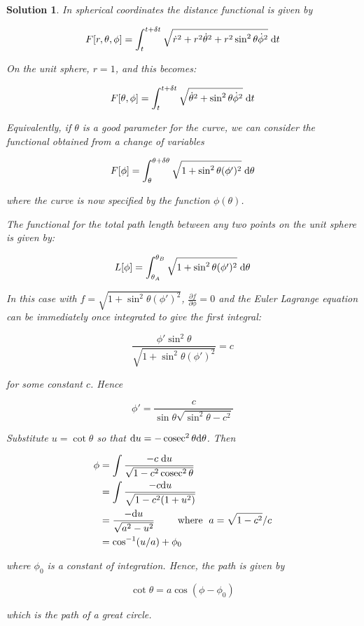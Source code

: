 \documentclass[a4paper]{article}
\newtheorem*{soln}{Solution}
\begin{document}
\begin{soln}
	In spherical coordinates the distance functional is given by 
	
	\[ F[r,\theta,\phi] = \int_{t}^{t + \delta t} \sqrt{\dot{r}^{2} + r^{2} \dot{\theta}^{2} + r^{2}\sin^{2}\theta \dot{\phi}^{2}} \; \mathrm{d} t \]
	
	On the unit sphere, $ r = 1 $, and this becomes:
	
		\[ F[\theta,\phi] = \int_{t}^{t + \delta t} \sqrt{ \dot{\theta}^{2} + \sin^{2}\theta \dot{\phi}^{2}} \; \mathrm{d} t \]
	
	
	 Equivalently, if $ \theta $ is a good parameter for the curve, we can consider the functional obtained from a change of variables
	
		\[ F[\phi] = \int_{\theta}^{\theta + \delta \theta} \sqrt{1 +  \sin^{2}\theta(\phi')^{2}} \; \mathrm{d} \theta \]
		
		where the curve is now specified by the function $ \phi(\theta) $.
		
		The functional for the total path length between any two points on the unit sphere is given by:
		
			\[ L[\phi] = \int_{\theta_{A}}^{\theta_{B}} \sqrt{1 +  \sin^{2}\theta(\phi')^{2}} \; \mathrm{d} \theta \] 
			
		In this case with $ f = \sqrt{1 +  \sin^{2}\theta(\phi')^{2}} $, $ \frac{\partial f }{\partial \phi} = 0 $ and the Euler Lagrange equation can be immediately once integrated to give the first integral:
		
		\[ \frac{\phi'\sin^{2}\theta}{\sqrt{1 +  \sin^{2}\theta(\phi')^{2}}} = c \]
		
		for some constant $ c $. Hence 
		
		\[ \phi' = \frac{c}{\sin \theta \sqrt{\sin^{2}\theta - c^{2}}} \]
		
		Substitute $ u = \cot \theta $ so that $ \mathrm{d} u = - \operatorname{cosec}^{2} \theta \mathrm{d} \theta $. Then
		
		\begin{align*}
		\phi & = \int \frac{-c \; \mathrm{d} u}{\sqrt{1 - c^{2}\operatorname{cosec}^{2}\theta}}\\
		& =  \int \frac{-c \mathrm{d} u}{\sqrt{1 - c^{2}(1 + u^{2})}} \\
		& = \frac{- \mathrm{d} u}{\sqrt{a^{2} - u^{2}}} \qquad \text{ where } \; a = \sqrt{1 - c^{2}} / c \\
		& = \cos^{-1}(u/a) + \phi_{0}
		\end{align*}
		
		where $ \phi_{0} $ is a constant of integration. Hence, the path is given by
		
		\[ \cot \theta = a \cos (\phi - \phi_{0}) \]
		
		which is the path of a great circle. 
	
	

\end{soln}
\end{document}
